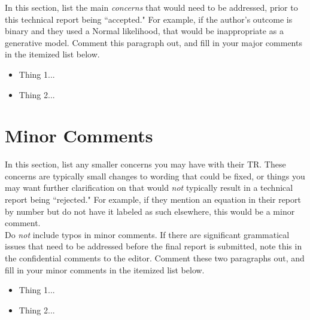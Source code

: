 \documentclass[11pt]{article}
\begin{document}
\noindent In this section, list the main \textit{concerns} that would need to be addressed, prior to this technical report being ``accepted." For example, if the author's outcome is binary and they used a Normal likelihood, that would be inappropriate as a generative model. Comment this paragraph out, and fill in your major comments in the itemized list below.

\begin{itemize}
    \item Thing 1...
    \item Thing 2...
\end{itemize}

\section*{Minor Comments}

In this section, list any smaller concerns you may have with their TR. These concerns are typically small changes to wording that could be fixed, or things you may want further clarification on that would \textit{not} typically result in a technical report being ``rejected." For example, if they mention an equation in their report by number but do not have it labeled as such elsewhere, this would be a minor comment. \\

\noindent Do \textit{not} include typos in minor comments. If there are significant grammatical issues that need to be addressed before the final report is submitted, note this in the confidential comments to the editor. Comment these two paragraphs out, and fill in your minor comments in the itemized list below.

\begin{itemize}
    \item Thing 1...
    \item Thing 2...
\end{itemize}
\end{document}
